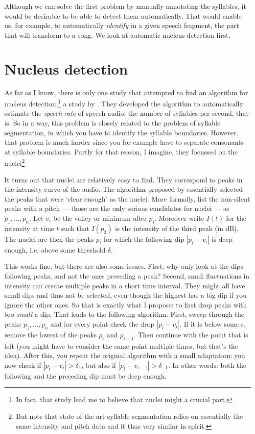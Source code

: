 \documentclass[a4paper,9pt]{article}
\begin{document}
Although we can solve the first problem by manually annotating the syllables, it would be desirable to be able to detect them automatically. That would enable us, for example, to automatically \emph{identify} in a given speech fragment, the part that will transform to a song. We look at automatic nucleus detection first.

\section{Nucleus detection}
As far as I know, there is only one study that attempted to find an algorithm for nucleus detection,\footnote{In fact, that study lead me to believe that nuclei might a crucial part.} a study by \citeauthor{DeJong2009a}. They developed the algorithm to automatically estimate the \emph{speech rate} of speech audio: the number of syllables per second, that is. So in a way, this problem is closely related to the problem of syllable segmentation, in which you have to identify the syllable boundaries. However, that problem is much harder since you for example have to separate consonants at syllable boundaries. Partly for that reason, I imagine, they focussed on the nuclei\footnote{But note that state of the art syllable segmentation relies on essentially the same intensity and pitch data and it thus very similar in spirit.}

It turns out that nuclei are relatively easy to find. They correspond to peaks in the intensity curve of the audio. The algorithm proposed by \citeauthor{DeJong2009a} essentially selected the peaks that were `clear enough' as the nuclei. More formally, list the non-silent peaks with a pitch --- those are the only serious candidates for nuclei --- as $p_1, \dots, p_n$. Let $v_i$ be the valley or minimum after $p_i$. Moreover write $I(t)$ for the intensity at time $t$ such that $I(p_3)$ is the intensity of the third peak (in dB). The nuclei are then the peaks $p_i$ for which the following dip $|p_i - v_i|$ is deep enough, i.e. above some threshold $\delta$.

This works fine, but there are also some issues. First, why only look at the dips following peaks, and not the ones preceding a peak? Second, small fluctuations in intensity can create multiple peaks in a short time interval. They might all have small dips and thus not be selected, even though the highest has a big dip if you ignore the other ones. So that is exactly what I propose: to first drop peaks with too \emph{small} a dip. That leads to the following algorithm. First, sweep through the peaks $p_1, \dots, p_n$ and for every point check the drop $|p_i - v_i|$. If it is below some $\epsilon$, remove the lowest of the peaks $p_i$ and $p_{i+1}$. Then continue with the point that is left (you might have to consider the same point multiple times, but that's the idea). After this, you repeat the original algorithm with a small adaptation: you now check if $|p_i - v_i| > \delta_1$, but also if $|p_i- v_{i-1}| > \delta_{-1}$. In other words: both the following and the preceding dip must be deep enough.
\end{document}
